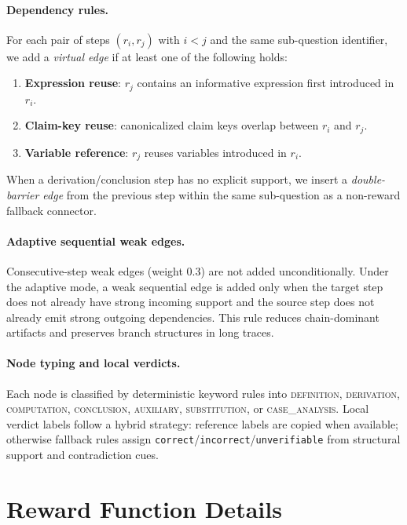 \paragraph{Dependency rules.}
For each pair of steps $(r_i, r_j)$ with $i<j$ and the same sub-question identifier, we add a \emph{virtual edge} if at least one of the following holds:
\begin{enumerate}[leftmargin=*,itemsep=1pt]
    \item \textbf{Expression reuse}: $r_j$ contains an informative expression first introduced in $r_i$.
    \item \textbf{Claim-key reuse}: canonicalized claim keys overlap between $r_i$ and $r_j$.
    \item \textbf{Variable reference}: $r_j$ reuses variables introduced in $r_i$.
\end{enumerate}
When a derivation/conclusion step has no explicit support, we insert a \emph{double-barrier edge} from the previous step within the same sub-question as a non-reward fallback connector.

\paragraph{Adaptive sequential weak edges.}
Consecutive-step weak edges (weight 0.3) are not added unconditionally.
Under the adaptive mode, a weak sequential edge is added only when the target step does not already have strong incoming support and the source step does not already emit strong outgoing dependencies.
This rule reduces chain-dominant artifacts and preserves branch structures in long traces.

\paragraph{Node typing and local verdicts.}
Each node is classified by deterministic keyword rules into
\textsc{definition}, \textsc{derivation}, \textsc{computation},
\textsc{conclusion}, \textsc{auxiliary}, \textsc{substitution}, or
\textsc{case\_analysis}.
Local verdict labels follow a hybrid strategy: reference labels are copied when available; otherwise fallback rules assign
\texttt{correct}/\texttt{incorrect}/\texttt{unverifiable} from structural support and contradiction cues.

\section{Reward Function Details}
\label{app:rewards}

